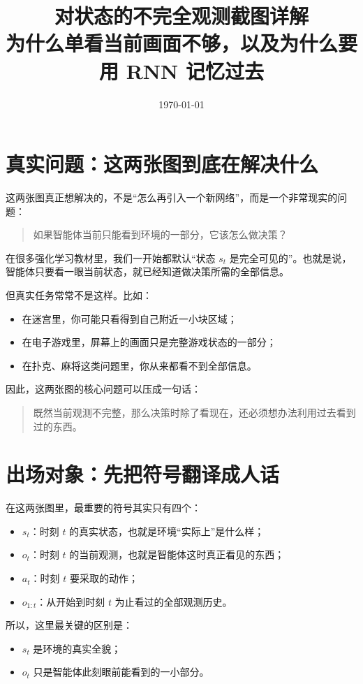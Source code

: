 \documentclass[12pt,a4paper]{ctexart}
\title{对状态的不完全观测截图详解\\
\large 为什么单看当前画面不够，以及为什么要用 RNN 记忆过去}
\author{}
\date{\today}
\begin{document}
\maketitle
\tableofcontents
\newpage

\section{真实问题：这两张图到底在解决什么}

这两张图真正想解决的，不是“怎么再引入一个新网络”，而是一个非常现实的问题：
\begin{quote}
如果智能体当前只能看到环境的一部分，它该怎么做决策？
\end{quote}

在很多强化学习教材里，我们一开始都默认“状态 \(s_t\) 是完全可见的”。也就是说，智能体只要看一眼当前状态，就已经知道做决策所需的全部信息。

但真实任务常常不是这样。比如：
\begin{itemize}
  \item 在迷宫里，你可能只看得到自己附近一小块区域；
  \item 在电子游戏里，屏幕上的画面只是完整游戏状态的一部分；
  \item 在扑克、麻将这类问题里，你从来都看不到全部信息。
\end{itemize}

因此，这两张图的核心问题可以压成一句话：
\begin{quote}
既然当前观测不完整，那么决策时除了看现在，还必须想办法利用过去看到过的东西。
\end{quote}

\section{出场对象：先把符号翻译成人话}

在这两张图里，最重要的符号其实只有四个：
\begin{itemize}
  \item \(s_t\)：时刻 \(t\) 的真实状态，也就是环境“实际上”是什么样；
  \item \(o_t\)：时刻 \(t\) 的当前观测，也就是智能体这时真正看见的东西；
  \item \(a_t\)：时刻 \(t\) 要采取的动作；
  \item \(o_{1:t}\)：从开始到时刻 \(t\) 为止看过的全部观测历史。
\end{itemize}

所以，这里最关键的区别是：
\begin{itemize}
  \item \(s_t\) 是环境的真实全貌；
  \item \(o_t\) 只是智能体此刻眼前能看到的一小部分。
\end{itemize}
\end{document}
